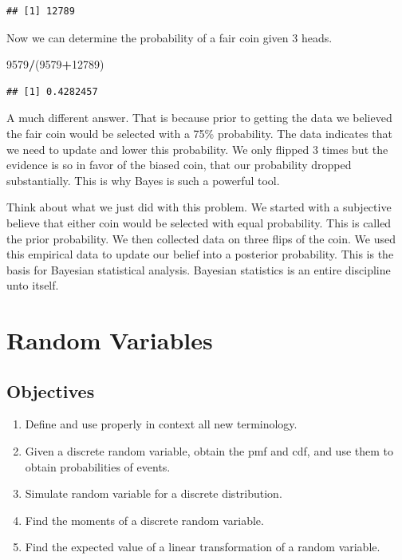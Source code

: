 \documentclass[
]{book}
\newenvironment{Shaded}{\begin{snugshade}}{\end{snugshade}}
\newcommand{\DecValTok}[1]{\textcolor[rgb]{0.00,0.00,0.81}{#1}}
\newcommand{\NormalTok}[1]{#1}
\newcommand{\OperatorTok}[1]{\textcolor[rgb]{0.81,0.36,0.00}{\textbf{#1}}}
\providecommand{\tightlist}{%
  \setlength{\itemsep}{0pt}\setlength{\parskip}{0pt}}
\begin{document}
\begin{verbatim}
## [1] 12789
\end{verbatim}

Now we can determine the probability of a fair coin given 3 heads.

\begin{Shaded}
\begin{Highlighting}[]
\DecValTok{9579}\OperatorTok{/}\NormalTok{(}\DecValTok{9579}\OperatorTok{+}\DecValTok{12789}\NormalTok{)}
\end{Highlighting}
\end{Shaded}

\begin{verbatim}
## [1] 0.4282457
\end{verbatim}

A much different answer. That is because prior to getting the data we believed the fair coin would be selected with a 75\% probability. The data indicates that we need to update and lower this probability. We only flipped 3 times but the evidence is so in favor of the biased coin, that our probability dropped substantially. This is why Bayes is such a powerful tool.

Think about what we just did with this problem. We started with a subjective believe that either coin would be selected with equal probability. This is called the prior probability. We then collected data on three flips of the coin. We used this empirical data to update our belief into a posterior probability. This is the basis for Bayesian statistical analysis. Bayesian statistics is an entire discipline unto itself.

\hypertarget{RANDVAR}{%
\chapter{Random Variables}\label{RANDVAR}}

\newcommand{\E}{\mbox{E}}
\newcommand{\Var}{\mbox{Var}}
\newcommand{\Cov}{\mbox{Cov}}
\newcommand{\Prob}{\mbox{P}}
\newcommand*\diff{\mathop{}\!\mathrm{d}}

\hypertarget{objectives-9}{%
\section{Objectives}\label{objectives-9}}

\begin{enumerate}
\def\labelenumi{\arabic{enumi})}
\tightlist
\item
  Define and use properly in context all new terminology.\\
\item
  Given a discrete random variable, obtain the pmf and cdf, and use them to obtain probabilities of events.\\
\item
  Simulate random variable for a discrete distribution.\\
\item
  Find the moments of a discrete random variable.\\
\item
  Find the expected value of a linear transformation of a random variable.
\end{enumerate}
\end{document}
